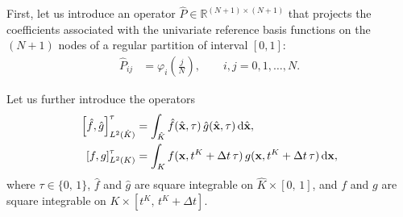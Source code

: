 \documentclass{scrreprt}
\theoremstyle{definition}
\theoremstyle{nonumberplain}
\renewcommand{\vec}[1]{{\textbf{#1}}}
\newcommand{\cell}{K}
\newcommand{\dV}{\text{d}\vec{x}}
\newcommand{\refVec}[1]{\hat{\vec{#1}}}
\newcommand{\refCell}{\hat{\cell}}
\newcommand{\refdV}{\textup{d}\hat{\vec{x}}}
\begin{document}
First, let us introduce an operator $\hat{P}\in\mathbb{R}^{(N+1)\times(N+1)}$
that projects the coefficients associated
with the univariate reference basis functions on
the $(N+1)$ nodes of a regular partition of interval $[0,1]$:
\begin{align}
\label{eq:ader_impl:operators:regular_mesh_projector_1d}
\hat{P}_{ij} &= \varphi_i \left({\frac{j}{N}}\right),\qquad
i,j=0,1,\ldots,N.
\end{align}

Let us further introduce the operators
\begin{align}
\left[\hat{f},\hat{g}\right]^{\tau}_{L^2(\refCell)}
&=
\int_{\refCell}
\hat{f}(\refVec{x},\tau)\,\hat{g}(\refVec{x},\tau)\,\refdV,
\\
\left[f,g\right]^{\tau}_{L^2(\cell)}
&=
\int_{\cell}
f(\vec{x},t^K+\Delta t\,\tau)\,g(\vec{x},t^K+\Delta t\,\tau)\,\dV,
\end{align}
where $\tau\in\{0,\,1\}$, $\hat{f}$ and $\hat{g}$ are square integrable on
$\refCell\times[0,\,1]$, and
$f$ and $g$ are square integrable on
$\cell\times[t^\cell,\,t^\cell+\Delta t]$.
\end{document}
